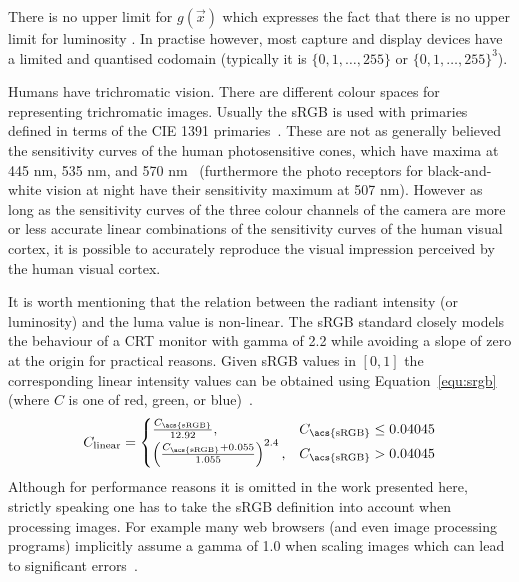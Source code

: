 \documentclass[12pt,a4paper,oneside,openright]{book}
\newcommand{\Eg}{For ex\-am\-ple }
\newcommand{\equ}[1]{Equation~\ref{equ:#1}}
\begin{document}
\begin{CJK}{UTF8}{}
There is no upper limit for $g(\vec{x})$ which expresses the fact that there is no upper limit for luminosity \citetext{see \citealp{RefWorks:422} for a detailed introduction to high dynamic range imaging}. In practise however, most capture and display devices have a limited and quantised codomain (typically it is $\{0,1,\ldots,255\}$ or $\{0,1,\ldots,255\}^3$).

Humans have trichromatic vision. There are different colour spaces for representing trichromatic images. Usually the \ac{sRGB} is used with primaries defined in terms of the \acs{CIE} 1391 primaries~\citep{cie}. These are not as generally believed the sensitivity curves of the human photosensitive cones, which have maxima at 445 nm, 535 nm, and 570 nm~\citep{RefWorks:440} (furthermore the photo receptors for black-and-white vision at night have their sensitivity maximum at 507 nm). However as long as the sensitivity curves of the three colour channels of the camera are more or less accurate linear combinations of the sensitivity curves of the human visual cortex, it is possible to accurately reproduce the visual impression perceived by the human visual cortex.

It is worth mentioning that the relation between the radiant intensity (or luminosity) and the luma value is non-linear. The \acs{sRGB} standard closely models the behaviour of a \ac{CRT} monitor with gamma of 2.2 while avoiding a slope of zero at the origin for practical reasons. Given \ac{sRGB} values in $[0,1]$ the corresponding linear intensity values can be obtained using \equ{srgb} (where $C$ is one of \acs{red}, \acs{green}, or \acs{blue})~\citep{srgb}.
\begin{equation}\label{equ:srgb}
  C_\mathrm{linear}=
  \begin{cases}\frac{C_\mathrm{\acs{sRGB}}}{12.92}, & C_\mathrm{\acs{sRGB}}\le0.04045\\
  \left(\frac{C_\mathrm{\acs{sRGB}}+0.055}{1.055}\right)^{2.4}, & C_\mathrm{\acs{sRGB}}>0.04045
  \end{cases}
\end{equation}
Although for performance reasons it is omitted in the work presented here, strictly speaking one has to take the \acs{sRGB} definition into account when processing images. \Eg many web browsers (and even image processing programs) implicitly assume a gamma of 1.0 when scaling images which can lead to significant errors~\citep{gamma}.


\end{CJK}
\end{document}
